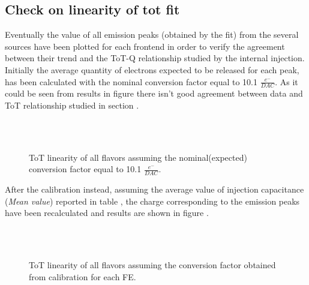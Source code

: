 \subsection{Check on linearity of tot fit}

Eventually the value of all emission peaks (obtained by the fit) from the several sources have been plotted for each frontend in order to verify the agreement between their trend and the ToT-Q relationship studied by the internal injection. \\

Initially the average quantity of electrons expected to be released for each peak, has been calculated with the nominal conversion factor equal to 10.1 $\frac{e^{-}}{DAC}$. As it could be seen from results in figure  there isn't good agreement between data and ToT relationship studied in section .

\begin{figure}
\centering
{}\quad
{}\\
\quad
{}\\
\caption{ToT linearity of all flavors assuming the nominal(expected) conversion factor equal to 10.1 $\frac{e^{-}}{DAC}$.}
\label{fig:inj_cap_10}
\end{figure} 

After the calibration instead, assuming the average value of injection capacitance (\textit{Mean value}) reported in table , the charge corresponding to the emission peaks have been recalculated and results are shown in figure .

\begin{figure}[h!]
\centering
{}\quad
{}\\
\quad
{}\\
\caption{ToT linearity of all flavors assuming the conversion factor obtained from calibration for each FE.}
\label{fig:inj_cap_sources}
\end{figure} 

